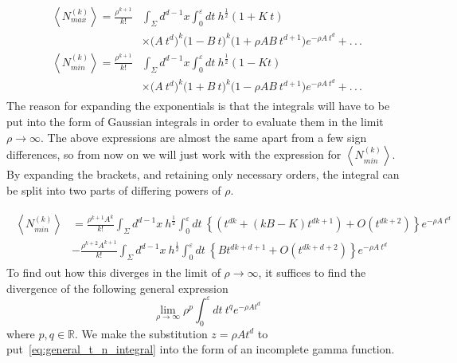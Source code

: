 \documentclass[12pt]{article}
\newcommand{\be}{\begin{equation}}
\newcommand{\ee}{\end{equation}}
\begin{document}
\begin{gather}\label{eq:nmax_and_eq:nmin_volume_expo_expanded}
\begin{aligned}
\left\langle N_{max}^{(k)}\right\rangle = \frac{\rho^{k+1}}{k!} & \int_{\Sigma}d^{d-1}x\int_{0}^{\varepsilon}dt\:
h^{\frac{1}{2}}\left(1+
K\: t\right)
 \\
 & \times \Big( A\: t^d \Big)^k 
 \Big( 1 - B\: t \Big)^k
 \Big( 1 + \rho A B\: t^{d+1} \Big)
 e^{-\rho A\: t^d} + .\,.\,.
\\
\left\langle N_{min}^{(k)}\right\rangle = \frac{\rho^{k+1}}{k!} & \int_{\Sigma}d^{d-1}x\int_{0}^{\varepsilon}dt\:
h^{\frac{1}{2}}\left(1-
Kt\right)
 \\
 & \times \Big( A\: t^d \Big)^k 
 \Big( 1 + B\: t \Big)^k
  \Big( 1 - \rho A B\: t^{d+1} \Big)
 e^{-\rho A\: t^d} + .\,.\,.
\end{aligned}
\end{gather}
The reason for expanding the exponentials is that the integrals will have to be put into the form of Gaussian integrals in order to evaluate them in the limit $\rho\rightarrow\infty$. The above expressions are almost the same apart from a few sign differences, so from now on we will just work with the expression for $\left\langle N_{min}^{(k)}\right\rangle$. By expanding the brackets, and retaining only necessary orders, the integral can be split into two parts of differing powers of $\rho$.

\begin{gather}\label{eq:n_min_different_rho_terms}
\begin{aligned}
\left\langle N_{min}^{(k)}\right\rangle & = \frac{\rho^{k+1}A^k}{k!}\int_{\Sigma}d^{d-1}x\: h^{\frac{1}{2}}\int_{0}^{\varepsilon}dt\:
\left\lbrace \left( t^{dk} + \left(kB-K \right)t^{dk+1}\right) + O\left(t^{dk+2}\right) \right\rbrace e^{-\rho A\: t^d}
 \\
 & - \frac{\rho^{k+2}A^{k+1}}{k!}\int_{\Sigma}d^{d-1}x\: h^{\frac{1}{2}}\int_{0}^{\varepsilon}dt\:
\left\lbrace Bt^{dk+d+1} + O\left(t^{dk+d+2}\right) \right\rbrace e^{-\rho A\: t^d}
\end{aligned}
\end{gather}
To find out how this diverges in the limit of $\rho \rightarrow\infty$, it suffices to find the divergence of the following general expression
\be\label{eq:general_t_n_integral}
\lim_{\rho\rightarrow\infty}\rho^{p}\int_{0}^{\varepsilon}dt\
t^{q}e^{-\rho At^{d}}
\ee
where $p,q \in \mathbb{R}$. We make the substitution $z=\rho At^{d}$ to put~\eqref{eq:general_t_n_integral} into the form of an incomplete gamma function.
\end{document}
